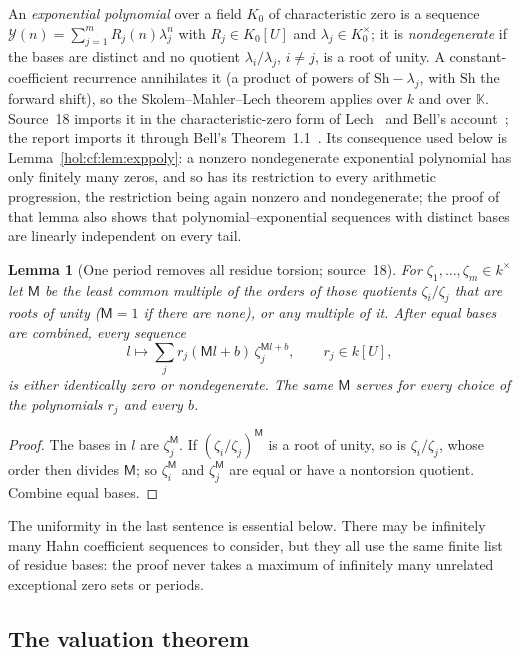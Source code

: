 \documentclass[11pt]{article}
\numberwithin{equation}{section}
\newtheorem{lemma}[theorem]{Lemma}
\theoremstyle{definition}
\theoremstyle{remark}
\newcommand{\KK}{\mathbb K}
\begin{document}
An \emph{exponential polynomial} over a field $K_0$ of characteristic zero is a
sequence $\mathcal Y(n)=\sum_{j=1}^mR_j(n)\lambda_j^n$ with $R_j\in K_0[U]$ and
$\lambda_j\in K_0^\times$; it is \emph{nondegenerate} if the bases are distinct
and no quotient $\lambda_i/\lambda_j$, $i\ne j$, is a root of unity. A
constant-coefficient recurrence annihilates it (a product of powers of
$\mathrm{Sh}-\lambda_j$, with $\mathrm{Sh}$ the forward shift), so the
Skolem--Mahler--Lech theorem applies over $k$ and over $\KK$. Source~18 imports
it in the characteristic-zero form of Lech~\cite{lech} and Bell's
account~\cite{belldoc}; the report imports it through Bell's
Theorem~1.1~\cite{bell}. Its consequence used below is
Lemma~\ref{hol:cf:lem:exppoly}: a nonzero nondegenerate exponential polynomial
has only finitely many zeros, and so has its restriction to every arithmetic
progression, the restriction being again nonzero and nondegenerate; the proof
of that lemma also shows that polynomial--exponential sequences with distinct
bases are linearly independent on every tail.

\begin{lemma}[One period removes all residue torsion; source~18]
\label{hol:ud:lem:period}
For $\zeta_1,\ldots,\zeta_m\in k^\times$ let $\mathsf M$ be the least common
multiple of the orders of those quotients $\zeta_i/\zeta_j$ that are roots of
unity ($\mathsf M=1$ if there are none), or any multiple of it. After equal
bases are combined, every sequence
\[
 l\longmapsto\sum_jr_j(\mathsf Ml+b)\,\zeta_j^{\mathsf Ml+b},\qquad r_j\in k[U],
\]
is either identically zero or nondegenerate. The same $\mathsf M$ serves for
every choice of the polynomials $r_j$ and every $b$.
\end{lemma}

\begin{proof}
The bases in $l$ are $\zeta_j^{\mathsf M}$. If $(\zeta_i/\zeta_j)^{\mathsf M}$
is a root of unity, so is $\zeta_i/\zeta_j$, whose order then divides
$\mathsf M$; so $\zeta_i^{\mathsf M}$ and $\zeta_j^{\mathsf M}$ are equal or
have a nontorsion quotient. Combine equal bases.
\end{proof}

The uniformity in the last sentence is essential below. There may be
infinitely many Hahn coefficient sequences to consider, but they all use the
same finite list of residue bases: the proof never takes a maximum of
infinitely many unrelated exceptional zero sets or periods.

\subsection{The valuation theorem}\label{hol:ud:sub:valuation}
\end{document}
